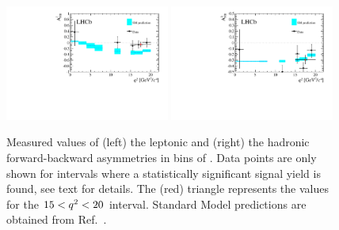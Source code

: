 \begin{figure}[ptb]
\centering
\includegraphics[width=0.48\textwidth]{Lmumu/figs/paper/figure8a.pdf}
\includegraphics[width=0.48\textwidth]{Lmumu/figs/paper/figure8b.pdf}
\caption{Measured values of (left) the leptonic and (right) the hadronic
  forward-backward asymmetries in bins of \qsq.
  Data points are only shown for \qsq intervals where a statistically
  significant signal yield is found, see text for details.
  The (red) triangle represents the values for the $15 < q^2 < 20$ \gevgevcccc
  interval. Standard Model predictions are obtained from Ref.~\cite{Meinel:2014wua}.}
\label{fig:Afb_results}
\end{figure}



